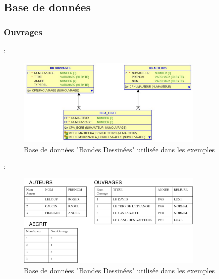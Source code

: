 \documentclass[10pt]{beamer}
\begin{document}
\subsection{Base de données}
\subsubsection{Ouvrages}
\begin{frame}{\subsecname : \subsubsecname}
    \begin{figure}
        \begin{center}
            \includegraphics[width=0.8\textwidth]{../assets/img/bd_ouvrages.pdf}
            \caption*{Base de données "Bandes Dessinées" utilisée dans les exemples}
            \label{Fig:bd_ouvrages}
        \end{center}
    \end{figure}
\end{frame}

\begin{frame}{\subsecname : \subsubsecname}
    \begin{figure}
        \begin{center}
            \includegraphics[width=0.8\textwidth]{../assets/img/bd_ouvrages--data.pdf}
            \caption*{Base de données "Bandes Dessinées" utilisée dans les exemples}
            \label{Fig:bd_ouvrages--data}
        \end{center}
    \end{figure}
\end{frame}
\end{document}
